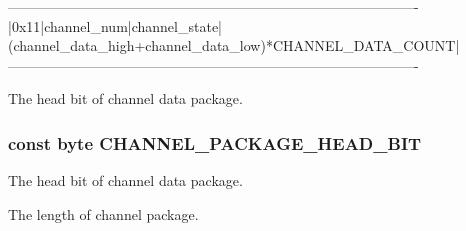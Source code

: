 \begin{DoxyVerb}----------------------------------------------------------------------------------------
|0x11|channel_num|channel_state|(channel_data_high+channel_data_low)*CHANNEL_DATA_COUNT|
----------------------------------------------------------------------------------------
\end{DoxyVerb}
The head bit of channel data package. \hypertarget{group___a_r_m_const_ga09ff0a5f36e6ede5798a5c19677d5518}{
\subsubsection[{C\-H\-A\-N\-N\-E\-L\-\_\-\-P\-A\-C\-K\-A\-G\-E\-\_\-\-H\-E\-A\-D\-\_\-\-B\-I\-T}]{\setlength{\rightskip}{0pt plus 5cm}const byte C\-H\-A\-N\-N\-E\-L\-\_\-\-P\-A\-C\-K\-A\-G\-E\-\_\-\-H\-E\-A\-D\-\_\-\-B\-I\-T}}\label{group___a_r_m_const_ga09ff0a5f36e6ede5798a5c19677d5518}
The head bit of channel data package.

The length of channel package.

